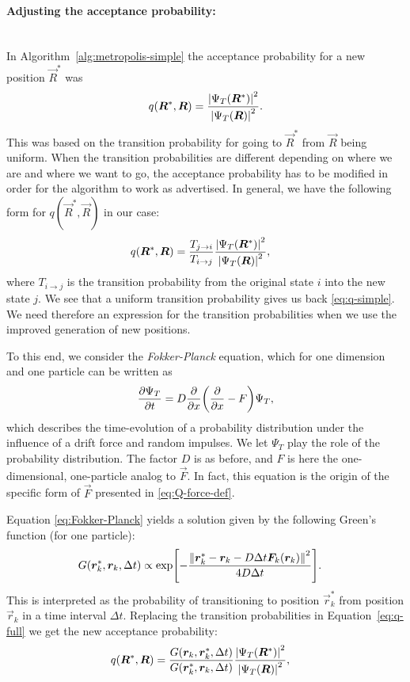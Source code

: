 \documentclass[a4paper, 11pt]{article}
\begin{document}
\begin{multicols}{2}
\paragraph{Adjusting the acceptance probability:}$\,$\\
In Algorithm~\ref{alg:metropolis-simple} the acceptance probability for a new
position $\vec R^*$ was
\begin{align}
    q(\bm R^*, \bm R) = \frac{\abs{\Psi_T(\bm R^*)}^2}{\abs{\Psi_T(\bm
    R)}^2}\label{eq:q-simple}.
\end{align}
This was based on the transition probability for going to $\vec R^*$ from $\vec
R$ being uniform. When the transition probabilities are different depending on 
where we are and where we want to go, the acceptance probability has to be
modified in order for the algorithm to work as advertised. In general, we have 
the following form for $q(\vec R^*, \vec R)$ in our case:
\begin{align}
    q(\bm R^*, \bm R) &= \frac{T_{j\rightarrow i}}{T_{i\rightarrow j}}\frac{\abs{\Psi_T(\bm R^*)}^2}{\abs{\Psi_T(\bm
    R)}^2},\label{eq:q-full}
\end{align}
where $T_{i\rightarrow j}$ is the transition probability from the original state
$i$ into the new state $j$. We see that a uniform transition probability gives
us back \eqref{eq:q-simple}. We need therefore an expression for the transition
probabilities when we use the improved generation of new positions.


To this end, we consider the \textit{Fokker-Planck} equation, which for one
dimension and one particle can be written as
\begin{align}
    \pdv{\Psi_T}{t} = D\pdv{}{x}\qty(\pdv{}{x} - F)\Psi_T,\label{eq:Fokker-Planck}
\end{align}
which describes the time-evolution of a probability distribution under the
influence of a drift force and random impulses. We let $\Psi_T$ play the role of the
probability distribution. The factor $D$ is as before, and $F$ is here the
one-dimensional, one-particle analog to $\vec F$. In
fact, this equation is the origin of the specific form of $\vec F$ presented in
\eqref{eq:Q-force-def}. 

Equation \eqref{eq:Fokker-Planck} yields a solution given by
the following Green's function (for one particle):
\begin{align}
    G(\bm r_k^*, \bm r_k, \Delta t) &\propto 
    \exp[- \frac{\norm{\bm r_k^* - \bm r_k - D\Delta t \bm F_k(\bm r_k)}^2}{4D\Delta t} ].
\end{align}
This is interpreted as the probability of transitioning to position $\vec r_k^*$
from position $\vec r_k$ in a time interval $\Delta t$. Replacing the transition
probabilities in Equation~\eqref{eq:q-full} we get the new acceptance
probability:
\begin{align}
    q(\bm R^*, \bm R) &= \frac{G(\bm r_k, \bm r_k^*, \Delta t)}{G(\bm r_k^*, \bm r_k, \Delta t)}\frac{\abs{\Psi_T(\bm R^*)}^2}{\abs{\Psi_T(\bm
    R)}^2},\label{eq:q-full-final}
\end{align}




\end{multicols}
\end{document}
